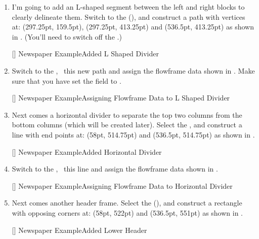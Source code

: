 \begin{enumerate}
[]
{}
{Newspaper Example\dash Assigning Flowframe Data to Right
Hand Polygon}

\item I'm going to add an L-shaped segment between the left and right
blocks to clearly delineate them. Switch to the
 (), and construct a
\gls{path} with vertices at: (297.25pt, 159.5pt), (297.25pt,
413.25pt) and (536.5pt, 413.25pt) as shown in .
(You'll need to switch off the \gridlock.)

[]
{}
{Newspaper Example\dash Added L Shaped Divider}

\item Switch to the , \select\
this new path and assign the \gls{flowframe} data shown in
.  Make sure that you have set the
 field to
.

[]
{}
{Newspaper Example\dash Assigning Flowframe Data to L Shaped
Divider}

\item Next comes a horizontal divider to separate the top two
columns from the bottom columns (which will be created
later). Select the , and construct a line
with end points at: (58pt, 514.75pt) and (536.5pt, 514.75pt) as shown
in \figureref{fig:news16}.

[]
{}
{Newspaper Example\dash Added Horizontal Divider}

\item Switch to the , \select\
this line and assign the \gls{flowframe} data shown in
\figureref{fig:news17}.

[]
{}
{Newspaper Example\dash Assigning Flowframe Data to
Horizontal Divider}

\item Next comes another header frame. Select the
 (),
and construct a rectangle with opposing corners at:
(58pt, 522pt) and (536.5pt, 551pt) as shown in .

\FloatFig{fig:news18}
[]
{}
{Newspaper Example\dash Added Lower Header}


\end{enumerate}
